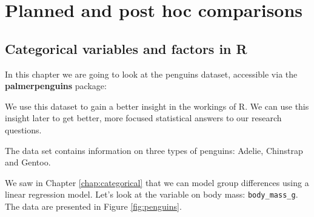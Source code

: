 
\chapter{Planned and post hoc comparisons}\label{chap:advanced}



\section{Categorical variables and factors in R}

In this chapter we are going to look at the penguins dataset, accessible via the \textbf{palmerpenguins} package:


\begin{knitrout}
\color{fgcolor}\begin{kframe}
\begin{alltt}
\end{alltt}
\end{kframe}
\end{knitrout}


We use this dataset to gain a better insight in the workings of R. We can use this insight later to get better, more focused statistical answers to our research questions.

The data set contains information on three types of penguins: Adelie, Chinstrap and Gentoo.


\begin{knitrout}
\color{fgcolor}
\end{knitrout}

We saw in Chapter \ref{chap:categorical} that we can model group differences using a linear regression model. Let's look at the variable on body mass: \texttt{body_mass_g}. The data are presented in Figure \ref{fig:penguins}.

\begin{knitrout}
\color{fgcolor}\begin{kframe}


{\ttfamily\noindent\bfseries{}}\end{kframe}
\end{knitrout}

